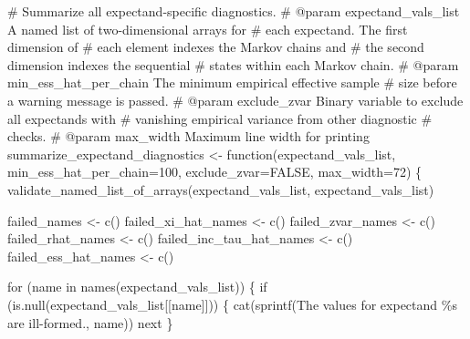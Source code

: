 \documentclass[
  letterpaper,
  DIV=11,
  numbers=noendperiod]{scrartcl}
\newenvironment{Shaded}{\begin{snugshade}}{\end{snugshade}}
\newcommand{\BuiltInTok}[1]{\textcolor[rgb]{0.00,0.23,0.31}{#1}}
\newcommand{\CommentTok}[1]{\textcolor[rgb]{0.37,0.37,0.37}{#1}}
\newcommand{\ControlFlowTok}[1]{\textcolor[rgb]{0.00,0.23,0.31}{#1}}
\newcommand{\DecValTok}[1]{\textcolor[rgb]{0.68,0.00,0.00}{#1}}
\newcommand{\KeywordTok}[1]{\textcolor[rgb]{0.00,0.23,0.31}{#1}}
\newcommand{\NormalTok}[1]{\textcolor[rgb]{0.00,0.23,0.31}{#1}}
\newcommand{\OperatorTok}[1]{\textcolor[rgb]{0.37,0.37,0.37}{#1}}
\newcommand{\SpecialCharTok}[1]{\textcolor[rgb]{0.37,0.37,0.37}{#1}}
\newcommand{\StringTok}[1]{\textcolor[rgb]{0.13,0.47,0.30}{#1}}
\begin{document}
\begin{Shaded}
\begin{Highlighting}[]
\CommentTok{\# Summarize all expectand{-}specific diagnostics.}
\CommentTok{\# @param expectand\_vals\_list A named list of two{-}dimensional arrays for}
\CommentTok{\#                            each expectand.  The first dimension of}
\CommentTok{\#                            each element indexes the Markov chains and}
\CommentTok{\#                            the second dimension indexes the sequential}
\CommentTok{\#                            states within each Markov chain.}
\CommentTok{\# @param min\_ess\_hat\_per\_chain The minimum empirical effective sample}
\CommentTok{\#                              size before a warning message is passed.}
\CommentTok{\# @param exclude\_zvar Binary variable to exclude all expectands with}
\CommentTok{\#                     vanishing empirical variance from other diagnostic}
\CommentTok{\#                     checks.}
\CommentTok{\# @param max\_width Maximum line width for printing}
\NormalTok{summarize\_expectand\_diagnostics }\OperatorTok{\textless{}{-}}\NormalTok{ function(expectand\_vals\_list,}
\NormalTok{                                            min\_ess\_hat\_per\_chain}\OperatorTok{=}\DecValTok{100}\NormalTok{,}
\NormalTok{                                            exclude\_zvar}\OperatorTok{=}\NormalTok{FALSE,}
\NormalTok{                                            max\_width}\OperatorTok{=}\DecValTok{72}\NormalTok{) \{}
\NormalTok{  validate\_named\_list\_of\_arrays(expectand\_vals\_list,}
                                \StringTok{\textquotesingle{}expectand\_vals\_list\textquotesingle{}}\NormalTok{)}

\NormalTok{  failed\_names }\OperatorTok{\textless{}{-}}\NormalTok{ c()}
\NormalTok{  failed\_xi\_hat\_names }\OperatorTok{\textless{}{-}}\NormalTok{ c()}
\NormalTok{  failed\_zvar\_names }\OperatorTok{\textless{}{-}}\NormalTok{ c()}
\NormalTok{  failed\_rhat\_names }\OperatorTok{\textless{}{-}}\NormalTok{ c()}
\NormalTok{  failed\_inc\_tau\_hat\_names }\OperatorTok{\textless{}{-}}\NormalTok{ c()}
\NormalTok{  failed\_ess\_hat\_names }\OperatorTok{\textless{}{-}}\NormalTok{ c()}

  \ControlFlowTok{for}\NormalTok{ (name }\KeywordTok{in}\NormalTok{ names(expectand\_vals\_list)) \{}
    \ControlFlowTok{if}\NormalTok{ (}\KeywordTok{is}\NormalTok{.null(expectand\_vals\_list[[name]])) \{}
\NormalTok{      cat(sprintf(}\StringTok{\textquotesingle{}The values for expectand \textasciigrave{}}\SpecialCharTok{\%s}\StringTok{\textasciigrave{} are ill{-}formed.\textquotesingle{}}\NormalTok{,}
\NormalTok{                  name))}
      \BuiltInTok{next}
\NormalTok{    \}}
    

\end{Highlighting}
\end{Shaded}
\end{document}
